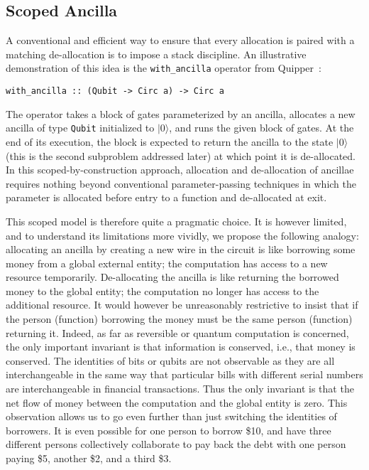 \documentclass[sigplan,10pt,review,anonymous]{acmart}
\newcommand{\ket}[1]{|#1\rangle}
\begin{document}
\subsection{Scoped Ancilla}

A conventional and efficient way to ensure that every allocation is
paired with a matching de-allocation is to impose a stack
discipline. An illustrative demonstration of this idea is the
\verb|with_ancilla| operator from
Quipper~\cite{Green:2013:QSQ:2491956.2462177}:
\begin{verbatim}
with_ancilla :: (Qubit -> Circ a) -> Circ a
\end{verbatim}
The operator takes a block of gates parameterized by an ancilla,
allocates a new ancilla of type \verb|Qubit| initialized to $\ket{0}$,
and runs the given block of gates. At the end of its execution, the
block is expected to return the ancilla to the state $\ket{0}$ (this
is the second subproblem addressed later) at which point it is
de-allocated. In this scoped-by-construction approach, allocation and
de-allocation of ancillae requires nothing beyond conventional
parameter-passing techniques in which the parameter is allocated
before entry to a function and de-allocated at exit.

This scoped model is therefore quite a pragmatic choice. It is however
limited, and to understand its limitations more vividly, we propose
the following analogy: allocating an ancilla by creating a new wire in
the circuit is like borrowing some money from a global external
entity; the computation has access to a new resource
temporarily. De-allocating the ancilla is like returning the borrowed
money to the global entity; the computation no longer has access to
the additional resource. It would however be unreasonably restrictive
to insist that if the person (function) borrowing the money must be
the same person (function) returning it.
Indeed, as far as reversible or quantum computation is concerned, the
only important invariant is that information is conserved, i.e., that
money is conserved. The identities of bits or qubits are not
observable as they are all interchangeable in the same way that
particular bills with different serial numbers are interchangeable in
financial transactions. Thus the only invariant is that the net flow
of money between the computation and the global entity is zero. This
observation allows us to go even further than just switching the
identities of borrowers. It is even possible for one person to borrow
\$10, and have three different persons collectively collaborate to
pay back the debt with one person paying \$5, another \$2, and a third
\$3.
\end{document}
